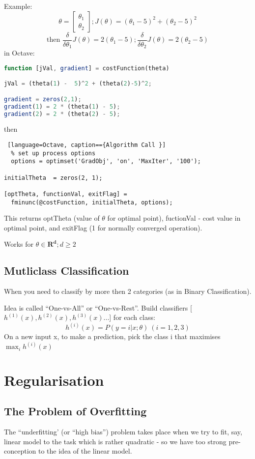 \documentclass{scrartcl}
\begin{document}
Example: \[\theta = \left[ \begin{array}{c} \theta_1 \\ \theta_2
  \end{array} \right]; J(\theta) = (\theta_1 - 5)^2 + (\theta_2- 5)^2 \]
\[\textrm{then } \frac{\delta}{\delta \theta_1}J(\theta) = 2(\theta_1
-5) ;\frac{\delta}{\delta \theta_2}J(\theta) = 2(\theta_2 - 5)
\]
in Octave:
\begin{lstlisting}[language=Octave, caption=={Plugin function }]
  function [jVal, gradient] = costFunction(theta) 

jVal = (theta(1) -  5)^2 + (theta(2)-5)^2; 

gradient = zeros(2,1); 
gradient(1) = 2 * (theta(1) - 5); 
gradient(2) = 2 * (theta(2) - 5);
\end{lstlisting}
then
\begin{lstlisting} [language=Octave, caption=={Algorithm Call }]
  % set up process options
  options = optimset('GradObj', 'on', 'MaxIter', '100'); 

initialTheta  = zeros(2, 1); 

[optTheta, functionVal, exitFlag] =  
  fminunc(@costFunction, initialTheta, options);
\end{lstlisting}
This returns optTheta (value of $\theta$ for optimal point),
fuctionVal - cost value in optimal point, and exitFlag (1 for normally
converged operation).

Works for $\theta \in \mathbf{R^d}; d \geq 2$

\subsection{Mutliclass Classification}
\label{sec:6-7}
When you need to classify by more then 2 categories (as in Binary
Classification).

Idea is called ``One-vs-All'' or ``One-vs-Rest''. Build classifiers
[$h^{(1)}(x), h^{(2)}(x), h^{(3)}(x)... $] for each class: \[
h^{(i)}(x) = P(y = i|x;\theta) \ (i = 1, 2, 3)
\]
On a new input x, to make a prediction, pick the class i that
maximises $\max_i h^{(i)}(x)$

\section{Regularisation}
\label{sec:7}

\subsection{The Problem of Overfitting}
\label{sec:7-1}
The ``underfitting' (or ``high bias'') problem takes place when we try
to fit, say, linear model to the task which is rather quadratic - so
we have too strong pre-conception to the idea of the linear model.
\end{document}
